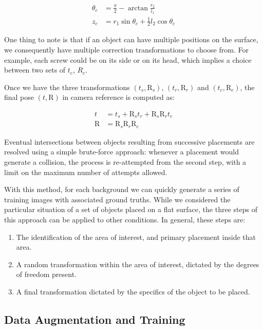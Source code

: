 \begin{align*}
    \theta_c &= \frac{\pi}{2} - \arctan \frac{r_2}{l_1}\\
    z_c &= r_1 \sin \theta_c + \frac{1}{2} l_2 \cos \theta_c
\end{align*}

One thing to note is that if an object can have multiple positions on the surface, we consequently have multiple correction transformations to choose from. For example, each screw could be on its side or on its head, which implies a choice between two sets of $t_c$, $R_c$.

Once we have the three transformations $(t_s, \text{R}_s)$, $(t_r, \text{R}_r)$ and $(t_c, \text{R}_c)$, the final pose $(t, \text{R})$ in camera reference is computed as:

\begin{align*}
    t &= t_s + \text{R}_s t_r + \text{R}_s \text{R}_r t_c\\
    \text{R} &= \text{R}_s \text{R}_r \text{R}_c
\end{align*}

Eventual intersections between objects resulting from successive placements are resolved using a simple brute-force approach: whenever a placement would generate a collision, the process is re-attempted from the second step, with a limit on the maximum number of attempts allowed.

With this method, for each background we can quickly generate a series of training images with associated ground truths. While we considered the particular situation of a set of objects placed on a flat surface, the three steps of this approach can be applied to other conditions. In general, these steps are:

\begin{enumerate}
    \item The identification of the area of interest, and primary placement inside that area.
    \item A random transformation within the area of interest, dictated by the degrees of freedom present.
    \item A final transformation dictated by the specifics of the object to be placed.
\end{enumerate}

\subsection{Data Augmentation and Training}

